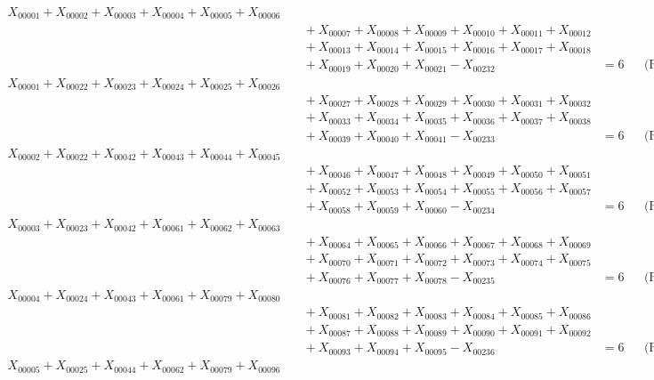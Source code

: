 \documentclass[a4paper,10pt]{article}
\begin{document}
\allowdisplaybreaks
{\small\begin{align}
X_{00001} + X_{00002} + X_{00003} + X_{00004} + X_{00005} + X_{00006} \\[0.5ex]
&\quad  + X_{00007} + X_{00008} + X_{00009} + X_{00010} + X_{00011} + X_{00012} \\[0.5ex]
&\quad  + X_{00013} + X_{00014} + X_{00015} + X_{00016} + X_{00017} + X_{00018} \\[0.5ex]
&\quad  + X_{00019} + X_{00020} + X_{00021} - X_{00232} &= 6 && \text{(R00001)} \\
X_{00001} + X_{00022} + X_{00023} + X_{00024} + X_{00025} + X_{00026} \\[0.5ex]
&\quad  + X_{00027} + X_{00028} + X_{00029} + X_{00030} + X_{00031} + X_{00032} \\[0.5ex]
&\quad  + X_{00033} + X_{00034} + X_{00035} + X_{00036} + X_{00037} + X_{00038} \\[0.5ex]
&\quad  + X_{00039} + X_{00040} + X_{00041} - X_{00233} &= 6 && \text{(R00002)} \\
X_{00002} + X_{00022} + X_{00042} + X_{00043} + X_{00044} + X_{00045} \\[0.5ex]
&\quad  + X_{00046} + X_{00047} + X_{00048} + X_{00049} + X_{00050} + X_{00051} \\[0.5ex]
&\quad  + X_{00052} + X_{00053} + X_{00054} + X_{00055} + X_{00056} + X_{00057} \\[0.5ex]
&\quad  + X_{00058} + X_{00059} + X_{00060} - X_{00234} &= 6 && \text{(R00003)} \\
X_{00003} + X_{00023} + X_{00042} + X_{00061} + X_{00062} + X_{00063} \\[0.5ex]
&\quad  + X_{00064} + X_{00065} + X_{00066} + X_{00067} + X_{00068} + X_{00069} \\[0.5ex]
&\quad  + X_{00070} + X_{00071} + X_{00072} + X_{00073} + X_{00074} + X_{00075} \\[0.5ex]
&\quad  + X_{00076} + X_{00077} + X_{00078} - X_{00235} &= 6 && \text{(R00004)} \\
X_{00004} + X_{00024} + X_{00043} + X_{00061} + X_{00079} + X_{00080} \\[0.5ex]
&\quad  + X_{00081} + X_{00082} + X_{00083} + X_{00084} + X_{00085} + X_{00086} \\[0.5ex]
&\quad  + X_{00087} + X_{00088} + X_{00089} + X_{00090} + X_{00091} + X_{00092} \\[0.5ex]
&\quad  + X_{00093} + X_{00094} + X_{00095} - X_{00236} &= 6 && \text{(R00005)} \\
X_{00005} + X_{00025} + X_{00044} + X_{00062} + X_{00079} + X_{00096} \\[0.5ex]

\end{align}}
\end{document}
